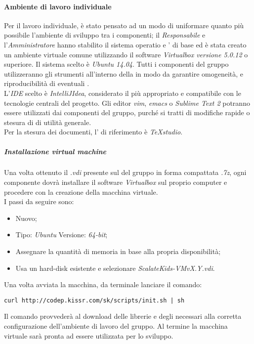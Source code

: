 \documentclass{scalatekids-article}
\begin{document}
\paragraph{Ambiente di lavoro individuale}
Per il lavoro individuale, è stato pensato ad un modo di uniformare quanto più
possibile l'ambiente di sviluppo tra i componenti; il \textit{Responsabile} e
l'\textit{Amministratore} hanno stabilito il sistema operatio e ' di base ed è stata creato
un ambiente virtuale comune utilizzando il software \textit{Virtualbox versione 5.0.12} o superiore. Il sistema scelto è \textit{Ubuntu 14.04}.
Tutti i componenti del gruppo utilizzeranno gli strumenti all'interno della
 in modo da garantire omogeneità, e riproducibilità di
eventuali .\\ L'\textit{IDE} scelto è \textit{IntelliJIdea}, considerato il
più appropriato e compatibile con le tecnologie centrali del progetto. Gli
editor \textit{vim}, \textit{emacs} o \textit{Sublime Text 2} potranno essere
utilizzati dai componenti del gruppo, purché si tratti di modifiche rapide o
stesura di  di utilità generale.\\
Per la stesura dei documenti, l' di riferimento è \textit{TeXstudio}.
\subparagraph{Installazione virtual machine}
\label{ref:MacchinaVirtuale}
Una volta ottenuto il  \textit{.vdi} presente sul  del gruppo
in forma compattata \textit{.7z}, ogni componente dovrà installare il software
\textit{Virtualbox} sul proprio computer e procedere con la creazione della
macchina virtuale.\\
I passi da seguire sono:
\begin{itemize}
\item Nuovo;
\item Tipo: \textit{Ubuntu} Versione: \textit{64-bit};
\item Assegnare la quantità di memoria in base alla propria disponibilità;
\item Usa un hard-disk esistente e selezionare \textit{ScalateKids-VMvX.Y.vdi}.
\end{itemize}
Una volta avviata la macchina, da terminale lanciare il comando:
\begin{center}
  \verb=curl http://codep.kissr.com/sk/scripts/init.sh | sh=
\end{center}
Il comando provvederà al download delle librerie e degli 
necessari alla corretta configurazione dell'ambiente di lavoro del gruppo.
Al termine la macchina virtuale sarà pronta ad essere utilizzata per lo sviluppo.
\end{document}
